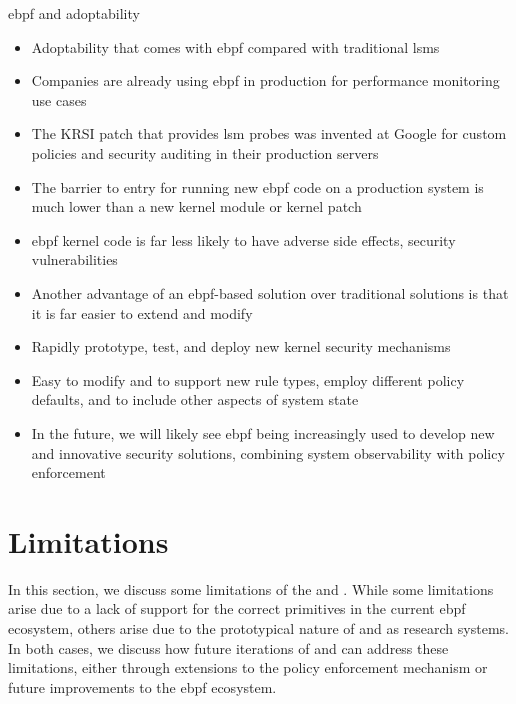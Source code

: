 \begin{inprogress}
  \gls{ebpf} and adoptability
  \begin{itemize}
    \item Adoptability that comes with \gls{ebpf} compared with traditional \glspl{lsm}
    \item Companies are already using \gls{ebpf} in production for performance monitoring use cases
    \item The KRSI patch that provides \gls{lsm} probes was invented at Google for custom policies and security auditing in their production servers
    \item The barrier to entry for running new \gls{ebpf} code on a production system is much lower than a new kernel module or kernel patch
    \item \gls{ebpf} kernel code is far less likely to have adverse side effects, security vulnerabilities

    \item Another advantage of an \gls{ebpf}-based solution over traditional solutions is that it is far easier to extend and modify
    \item Rapidly prototype, test, and deploy new kernel security mechanisms
    \item Easy to modify \bpfbox{} and \bpfcontain{} to support new rule types, employ different policy defaults, and to include other aspects of system state
    \item In the future, we will likely see \gls{ebpf} being increasingly used to develop new and innovative security solutions, combining
    system observability with policy enforcement
  \end{itemize}
\end{inprogress}


\section{Limitations}%
\label{s:disc-limitations}

In this section, we discuss some limitations of the \bpfbox{} and \bpcontain{}.
While some limitations arise due to a lack of support for the correct primitives
in the current \gls{ebpf} ecosystem, others arise due to the prototypical nature of \bpfbox{}
and \bpfcontain{} as research systems. In both cases, we discuss how future iterations
of \bpfbox{} and \bpfcontain can address these limitations, either through extensions to
the policy enforcement mechanism or future improvements to the \gls{ebpf} ecosystem.

